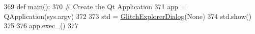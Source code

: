 \begin{DoxyCode}
369 \textcolor{keyword}{def }\hyperlink{namespacesoftware_1_1chipwhisperer_1_1capture_1_1utils_1_1GlitchExplorerDialog_a1f23e047284e5001ea9246271aeb47cd}{main}():
370     \textcolor{comment}{# Create the Qt Application}
371     app = QApplication(sys.argv)
372 
373     std = \hyperlink{classsoftware_1_1chipwhisperer_1_1capture_1_1utils_1_1GlitchExplorerDialog_1_1GlitchExplorerDialog}{GlitchExplorerDialog}(\textcolor{keywordtype}{None})
374     std.show()
375 
376     app.exec\_()
377 
\end{DoxyCode}
